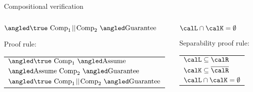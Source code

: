 \documentclass[../talk.tex]{subfiles}
\begin{document}
\begin{frame}{Compositional verification}
    \begin{overlayarea}{\slidewidth}{\slideheight}
        \begin{columns}[t,onlytextwidth]%
            \begin{column}{0.6\textwidth}%
                \(
                    \relyguarantee{\true}{\text{Comp}_1 \!\mid\mid\! \text{Comp}_2}
                    {\text{Guarantee}}
                \)

                    \vspace*{1em}

                    Proof rule:

                    \vspace*{1em}

                    \begin{tabular}{l}
                        $\relyguarantee{\true}{\text{Comp}_1}{\text{Assume}}$
                        \\
                        $\relyguarantee{\text{Assume}}{\text{Comp}_2}{\text{Guarantee}}$
                        \\
                        \cline{1-1}
                        $\relyguarantee{\true}{\text{Comp}_1 \!\mid\mid\! \text{Comp}_2 }{\text{Guarantee}}$
                    \end{tabular}

            \end{column}%
            \begin{column}{0.4\textwidth}%
                    \(
                        \calL \cap \calK
                        = \emptyset
                    \)

                    \vspace*{1em}

                    \alert{Separability} proof rule:

                    \vspace*{1em}

                    \begin{tabular}{l}
                        $\calL \subseteq \calR$
                        \\
                        $\calK \subseteq \overline{\calR}$
                        \\
                        \cline{1-1}
                        $\calL \cap \calK
                        = \emptyset$
                    \end{tabular}
            \end{column}
        \end{columns}


\end{overlayarea}
\end{frame}
\end{document}
